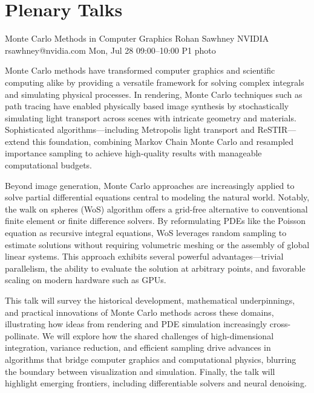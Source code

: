 \chapter{Plenary Talks}\newpage

\begin{talk}
  {Monte Carlo Methods in Computer Graphics}%
  {Rohan Sawhney}%
  {NVIDIA}%
  {rsawhney@nvidia.com}%
  {}%
  {}%
  {Mon, Jul 28 09:00--10:00}%
  {P1}%
  {photo}%
  {}%
  
    
   
Monte Carlo methods have transformed computer graphics and scientific computing alike by providing a versatile framework for solving complex integrals and simulating physical processes. In rendering, Monte Carlo techniques such as path tracing have enabled physically based image synthesis by stochastically simulating light transport across scenes with intricate geometry and materials. Sophisticated algorithms---including Metropolis light transport and ReSTIR---extend this foundation, combining Markov Chain Monte Carlo and resampled importance sampling to achieve high-quality results with manageable computational budgets.

Beyond image generation, Monte Carlo approaches are increasingly applied to solve partial differential equations central to modeling the natural world. Notably, the walk on spheres (WoS) algorithm offers a grid-free alternative to conventional finite element or finite difference solvers. By reformulating PDEs like the Poisson equation as recursive integral equations, WoS leverages random sampling to estimate solutions without requiring volumetric meshing or the assembly of global linear systems. This approach exhibits several powerful advantages---trivial parallelism, the ability to evaluate the solution at arbitrary points, and favorable scaling on modern hardware such as GPUs.

This talk will survey the historical development, mathematical underpinnings, and practical innovations of Monte Carlo methods across these domains, illustrating how ideas from rendering and PDE simulation increasingly cross-pollinate. We will explore how the shared challenges of high-dimensional integration, variance reduction, and efficient sampling drive advances in algorithms that bridge computer graphics and computational physics, blurring the boundary between visualization and simulation. Finally, the talk will highlight emerging frontiers, including differentiable solvers and neural denoising.


\end{talk}
